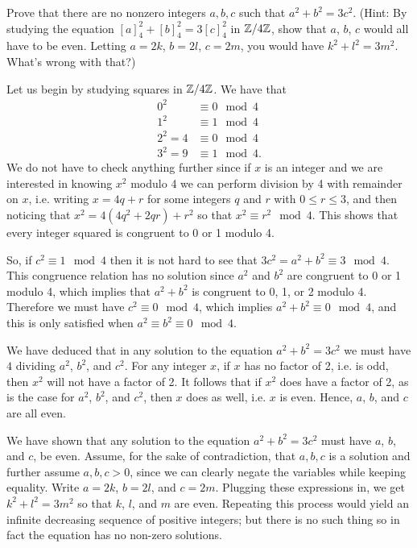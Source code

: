 \begin{exercise}
	Prove that there are no nonzero integers $a,b,c$ such that $a^2 + b^2 = 3c^2$. (Hint: By studying the equation $[a]_4^2 + [b]_4^2 = 3[c]_4^2$ in $\mathbb{Z}/4\mathbb{Z}$, show that $a$, $b$, $c$ would all have to be even. Letting $a = 2k$, $b= 2l$, $c = 2m$, you would have $k^2 + l^2 = 3m^2$. What's wrong with that?)
\end{exercise}
\begin{solution}
	Let us begin by studying squares in $\mathbb{Z}/4\mathbb{Z}$. We have that
		\begin{align*}
			0^2 &\equiv 0 \mod 4\\
			1^2 &\equiv 1 \mod 4 \\
			2^2 = 4 &\equiv 0 \mod 4\\
			3^2 = 9 &\equiv 1 \mod 4. 
		\end{align*}
	We do not have to check anything further since if $x$ is an integer and we are interested in knowing $x^2$ modulo 4 we can perform division by 4 with remainder on $x$, i.e. writing $x = 4q + r$ for some integers $q$ and $r$ with $0\leq r \leq 3$, and then noticing that $x^2 = 4(4q^2 + 2qr) + r^2$ so that $x^2 \equiv r^2 \mod 4$. This shows that every integer squared is congruent to 0 or 1 modulo 4.
	
	So, if $c^2 \equiv 1 \mod 4$ then it is not hard to see that $3c^2 = a^2+b^2 \equiv 3 \mod 4$. This congruence relation has no solution since $a^2$ and $b^2$ are congruent to 0 or 1 modulo 4, which implies that $a^2 + b^2$ is congruent to 0, 1, or 2 modulo 4.  Therefore we must have $c^2 \equiv 0 \mod 4$, which implies $a^2 + b^2 \equiv 0 \mod 4$, and this is only satisfied when $a^2 \equiv b^2 \equiv 0 \mod 4$.
	
	We have deduced that in any solution to the equation $a^2 + b^2 = 3c^2$ we must have $4$ dividing $a^2$, $b^2$, and $c^2$. For any integer $x$, if $x$ has no factor of 2, i.e. is odd, then $x^2$ will not have a factor of 2. It follows that if $x^2$ does have a factor of 2, as is the case for $a^2$, $b^2$, and $c^2$, then $x$ does as well, i.e. $x$ is even. Hence, $a$, $b$, and $c$ are all even.
	
	We have shown that any solution to the equation $a^2 + b^2 = 3c^2$ must have $a$, $b$, and $c$, be even. Assume, for the sake of contradiction, that $a,b,c$ is a solution and further assume $a,b,c > 0$, since we can clearly negate the variables while keeping equality. Write $a = 2k$, $b = 2l$, and $c = 2m$. Plugging these expressions in, we get $k^2 + l^2 = 3m^2$ so that $k$, $l$, and $m$ are even. Repeating this process would yield an infinite decreasing sequence of positive integers; but there is no such thing so in fact the equation has no non-zero solutions.
\end{solution}

